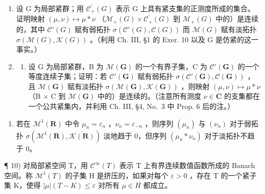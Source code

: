 \begin{enumerate}
\def\labelenumi{\arabic{enumi})}
\setcounter{enumi}{7}
\item
  设 G 为局部紧群；用 \(\mathcal{C}_{+}^{\prime}(G)\) 表示 G 上具有紧支集的正测度所成的集合。证明映射 \((\mu, \nu) \mapsto \mu * \nu\) （\(\mathcal{M}_{+}(G) \times \mathcal{C}_{+}^{\prime}(G)\) 到 \(\mathcal{M}_{+}(G)\) 中的）是连续的，其中 \(\mathcal{C}'(G)\) 赋有弱拓扑 \(\sigma(\mathcal{C}'(G), \mathcal{C}(G))\) 而 \(\mathcal{M}(G)\) 赋有淡拓扑 \(\sigma(\mathcal{M}(G), \mathcal{K}(G))\) 。（利用 Ch. III, §1 的 Exer. 10 以及 G 是仿紧的这一事实。）
\item
  \begin{enumerate}
  \def\labelenumii{\alph{enumii})}
  \tightlist
  \item
    设 G 为局部紧群，B 为 \(\mathcal{M}(\mathbf{G})\) 的一个有界子集，C 为 \(\mathcal{C}'(\mathbf{G})\) 的一个等度连续子集；证明：若 \(\mathcal{C}'(\mathbf{G})\) 赋有弱拓扑 \(\sigma(\mathcal{C}'(\mathbf{G}), \mathcal{C}(\mathbf{G}))\) ，且 \(\mathcal{M}(\mathbf{G})\) 赋有淡拓扑 \(\sigma(\mathcal{M}(\mathbf{G}), \mathcal{K}(\mathbf{G}))\) ，则映射 \((\mu, \nu) \mapsto \mu * \nu\) （B × C 到 \(\mathcal{M}(\mathbf{G})\) 中的）是连续的。（注意所有测度 \(\nu \in \mathbf{C}\) 的支集都在一个公共紧集内，并利用 Ch. III, §4, No.~3 中 Prop. 6 后的注。）
  \end{enumerate}
\end{enumerate}

\begin{enumerate}
\def\labelenumi{\alph{enumi})}
\setcounter{enumi}{1}
\tightlist
\item
  若在 \(\mathcal{M}^1 (\mathbf{R})\) 中令 \(\mu_n = \varepsilon_n\) ，\(\nu_{n} = \varepsilon_{-n}\) ，则序列 \((\mu_n)\) 与 \((\nu_{n})\) 对于弱拓扑 \(\sigma (\mathcal{M}^1 (\mathbf{R}),\overline{\mathcal{K}(\mathbf{R})})\) 淡地趋于 0，但序列 \((\mu_n*\nu_n)\) 对于淡拓扑不趋于 0。
\end{enumerate}

¶ 10) 对局部紧空间 T，用 \(\mathcal{C}^{\infty}(T)\) 表示 T 上有界连续数值函数所成的 Banach 空间。称 \(\mathcal{M}^{1}(T)\) 的子集 H 是挤压的，如果对每个 \(\varepsilon > 0\) ，存在 T 的一个紧子集 K，使得 \(|\mu|(T - K) \leqslant \varepsilon\) 对所有 \(\mu \in H\) 都成立。

